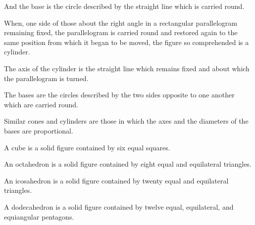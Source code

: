 \documentclass{rrxiv}
\begin{document}
\begin{scope}
\label{def:XI.20}
And the base is the circle described by the straight line which is
carried round.
\end{scope}

\begin{scope}
\label{def:XI.21}
When, one side of those about the right angle in a rectangular
parallelogram remaining fixed, the parallelogram is carried round and
restored again to the same position from which it began to be moved,
the figure so comprehended is a cylinder.
\end{scope}

\begin{scope}
\label{def:XI.22}
The axis of the cylinder is the straight line which remains fixed and
about which the parallelogram is turned.
\end{scope}

\begin{scope}
\label{def:XI.23}
The bases are the circles described by the two sides opposite to one
another which are carried round.
\end{scope}

\begin{scope}
\label{def:XI.24}
Similar cones and cylinders are those in which the axes and the
diameters of the bases are proportional.
\end{scope}

\begin{scope}
\label{def:XI.25}
A cube is a solid figure contained by six equal squares.
\end{scope}

\begin{scope}
\label{def:XI.26}
An octahedron is a solid figure contained by eight equal and
equilateral triangles.
\end{scope}

\begin{scope}
\label{def:XI.27}
An icosahedron is a solid figure contained by twenty equal and
equilateral triangles.
\end{scope}

\begin{scope}
\label{def:XI.28}
A dodecahedron is a solid figure contained by twelve equal,
equilateral, and equiangular pentagons.
\end{scope}
\end{document}
